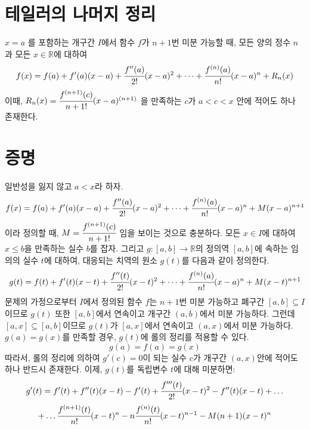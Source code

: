 \documentclass{article}
\begin{document}
\section{테일러의 나머지 정리}
$x=a$ 를 포함하는 개구간 $I$에서 함수 $f$가 $n+1$번 미분 가능할 때, 모든 양의 정수 $n$과 모든 $x \in \mathbb{R}$에 대하여
\begin{equation}
f(x)=f(a)+f'(a)(x-a)+\cfrac{f''(a)}{2!}(x-a)^2+\dots+\cfrac{f^{(n)}(a)}{n!}(x-a)^n+R_n(x)
\end{equation}
이때, $R_n(x)=\cfrac{f^{(n+1)}(c)}{n+1!}(x-a)^{(n+1)}$ 을 만족하는 $c$가 $a<c<x$ 안에 적어도 하나 존재한다.

\section{증명}
일반성을 잃지 않고 $a<x$라 하자.
\begin{equation}
f(x)=f(a)+f'(a)(x-a)+\cfrac{f''(a)}{2!}(x-a)^2+\dots+\cfrac{f^{(n)}(a)}{n!}(x-a)^n+M(x-a)^{n+1}
\end{equation}
이라 정의할 때, $M=\cfrac{f^{(n+1)}(c)}{n+1!}$ 임을 보이는 것으로 충분하다.\newline
모든 $x \in I$에 대하여 $x\leq b$을 만족하는 실수 $b$를 잡자. 그리고 $g : [a,b] \longrightarrow \mathbb{R}$의 정의역 $[a,b]$에 속하는 임의의 실수 $t$에 대하여, 대응되는 치역의 원소 $g(t)$를 다음과 같이 정의한다.
\begin{equation}
g(t)=f(t)+f'(t)(x-t)+\cfrac{f''(t)}{2!}(x-t)^2+\dots+\cfrac{f^{(n)}(a)}{n!}(x-a)^n+M(x-t)^{n+1}
\end{equation}
문제의 가정으로부터 $I$에서 정의된 함수 $f$는 $n+1$번 미분 가능하고 폐구간 $[a,b]\subseteq I$이므로 $g(t)$ 또한 $[a,b]$에서 연속이고 개구간 $(a,b)$에서 미분 가능하다.\newline
그런데 $[a,x] \subseteq [a,b]$이므로 $g(t)$가 $[a,x]$에서 연속이고 $(a,x)$에서 미분 가능하다. $g(a)=g(x)$를 만족할 경우, $g(t)$에 롤의 정리를 적용할 수 있다. \newline
\begin{equation}
g(a)=f(a)=g(x)
\end{equation}
따라서, 롤의 정리에 의하여 $g'(c)=0$이 되는 실수 $c$가 개구간 $(a,x)$안에 적어도 하나 반드시 존재한다. \newline
이제, $g(t)$를 독립변수 $t$에 대해 미분하면:
\begin{eqnarray}
g'(t)=f'(t)+f''(t)(x-t)-f'(t)+\cfrac{f'''(t)}{2!}(x-t)^2-f''(t)(x-t)+\dots
\end{eqnarray}
\begin{equation}
+\dots \cfrac{f^{(n+1)}(t)}{n!}(x-t)^n-n\cfrac{f^{(n)}(t)}{n!}(x-t)^{n-1}-M(n+1)(x-t)^n
\end{equation}
\end{document}
